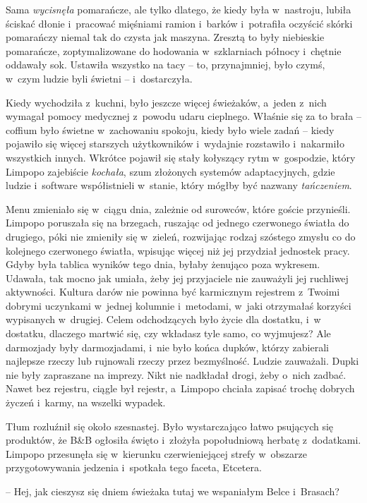 \documentclass[oneside,polish,11pt,sfheadings]{mwbk}
\begin{document}
Sama \textit{wycisnęła} pomarańcze, ale tylko dlatego, że kiedy była w~nastroju, lubiła ściskać dłonie i~pracować mięśniami ramion i~barków i~potrafiła oczyścić skórki pomarańczy niemal tak do czysta jak maszyna.
Zresztą to były niebieskie pomarańcze, zoptymalizowane do hodowania w~szklarniach północy i~chętnie oddawały sok. Ustawiła wszystko na tacy -- to, przynajmniej, było czymś, w~czym ludzie byli świetni -- i~dostarczyła.

Kiedy wychodziła z~kuchni, było jeszcze więcej świeżaków, a~jeden z~nich
wymagał pomocy medycznej z~powodu udaru cieplnego. Właśnie się za to
brała -- coffium było świetne w~zachowaniu spokoju, kiedy było wiele
zadań -- kiedy pojawiło się więcej starszych użytkowników i~wydajnie
rozstawiło i~nakarmiło wszystkich innych. Wkrótce pojawił się stały
kołyszący rytm w~gospodzie, który Limpopo zajebiście \textit{kochała},
szum złożonych systemów adaptacyjnych, gdzie ludzie i~software
współistnieli w~stanie, który mógłby być nazwany \textit{tańczeniem}.

Menu zmieniało się w~ciągu dnia, zależnie od surowców, które goście
przynieśli. Limpopo poruszała się na brzegach, ruszając od jednego
czerwonego światła do drugiego, póki nie zmieniły się w~zieleń,
rozwijając rodzaj szóstego zmysłu co do kolejnego czerwonego światła,
wpisując więcej niż jej przydział jednostek pracy. Gdyby była tablica
wyników tego dnia, byłaby żenująco poza wykresem. Udawała, tak mocno jak
umiała, żeby jej przyjaciele nie zauważyli jej ruchliwej aktywności.
Kultura darów nie powinna być karmicznym rejestrem z~Twoimi dobrymi
uczynkami w~jednej kolumnie i~metodami, w~jaki otrzymałaś korzyści
wypisanych w~drugiej. Celem odchodzących było życie dla dostatku, i~w dostatku, dlaczego martwić się, czy wkładasz tyle samo, co wyjmujesz?
Ale darmozjady były darmozjadami, i~nie było końca dupków, którzy
zabierali najlepsze rzeczy lub rujnowali rzeczy przez bezmyślność.
Ludzie zauważali. Dupki nie były zapraszane na imprezy. Nikt nie
nadkładał drogi, żeby o~nich zadbać. Nawet bez rejestru, ciągle był
rejestr, a~Limpopo chciała zapisać trochę dobrych życzeń i~karmy, na
wszelki wypadek.

Tłum rozluźnił się około szesnastej. Było wystarczająco łatwo psujących
się produktów, że B\&B ogłosiła święto i~złożyła popołudniową herbatę z~dodatkami. Limpopo przesunęła się w~kierunku czerwieniejącej strefy w~obszarze przygotowywania jedzenia i~spotkała tego faceta, Etcetera.

-- Hej, jak cieszysz się dniem świeżaka tutaj we wspaniałym Belce i~Brasach?
\end{document}
